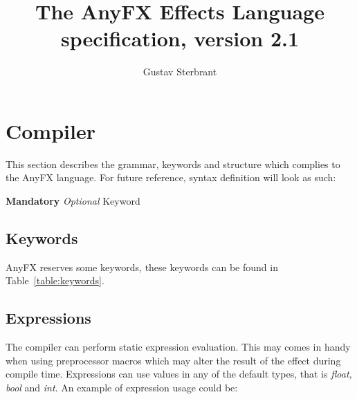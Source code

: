 \documentclass{article}
\newcommand{\SyntaxBox}[1]
{	
	\begin{center}
	\colorbox{orange!60}
	{
		\begin{minipage}{\linewidth}
		\hfill
		\begin{tabbing}
		#1
		\end{tabbing}
		\end{minipage}
	}
	\end{center}
}
\begin{document}
\title{The AnyFX Effects Language specification, version 2.1}
\author{Gustav Sterbrant}
\date{}
\maketitle

\clearpage
\tableofcontents
\clearpage

\section{Compiler}
This section describes the grammar, keywords and structure which complies to the AnyFX language. For future reference, syntax definition will look as such:

\SyntaxBox
{
	\textbf{Mandatory} \textit{Optional} Keyword
}

\subsection{Keywords}
AnyFX reserves some keywords, these keywords can be found in Table~\ref{table:keywords}.

\begin{table}[hp]
\centering
\caption{Keywords}
\label{table:keywords}
\end{table}

\subsection{Expressions}
The compiler can perform static expression evaluation. This may comes in handy when using preprocessor macros which may alter the result of the effect during compile time. Expressions can use values in any of the default types, that is \textit{float, bool} and \textit{int}. An example of expression usage could be:
\end{document}
